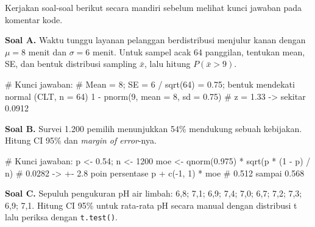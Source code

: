 \documentclass[
  indonesian,
  letterpaper,
]{book}
\newenvironment{Shaded}{\begin{snugshade}}{\end{snugshade}}
\newcommand{\AttributeTok}[1]{\textcolor[rgb]{0.40,0.45,0.13}{#1}}
\newcommand{\CommentTok}[1]{\textcolor[rgb]{0.37,0.37,0.37}{#1}}
\newcommand{\DecValTok}[1]{\textcolor[rgb]{0.68,0.00,0.00}{#1}}
\newcommand{\FloatTok}[1]{\textcolor[rgb]{0.68,0.00,0.00}{#1}}
\newcommand{\FunctionTok}[1]{\textcolor[rgb]{0.28,0.35,0.67}{#1}}
\newcommand{\NormalTok}[1]{\textcolor[rgb]{0.00,0.23,0.31}{#1}}
\newcommand{\OtherTok}[1]{\textcolor[rgb]{0.00,0.23,0.31}{#1}}
\newcommand{\SpecialCharTok}[1]{\textcolor[rgb]{0.37,0.37,0.37}{#1}}
\begin{document}
Kerjakan soal-soal berikut secara mandiri sebelum melihat kunci jawaban
pada komentar kode.

\textbf{Soal A.} Waktu tunggu layanan pelanggan berdistribusi menjulur
kanan dengan \(\mu = 8\) menit dan \(\sigma = 6\) menit. Untuk sampel
acak 64 panggilan, tentukan mean, SE, dan bentuk distribusi sampling
\(\bar{x}\), lalu hitung \(P(\bar{x} > 9)\).

\begin{Shaded}
\begin{Highlighting}[]
\CommentTok{\# Kunci jawaban:}
\CommentTok{\# Mean = 8; SE = 6 / sqrt(64) = 0.75; bentuk mendekati normal (CLT, n = 64)}
\DecValTok{1} \SpecialCharTok{{-}} \FunctionTok{pnorm}\NormalTok{(}\DecValTok{9}\NormalTok{, }\AttributeTok{mean =} \DecValTok{8}\NormalTok{, }\AttributeTok{sd =} \FloatTok{0.75}\NormalTok{)   }\CommentTok{\# z = 1.33 {-}\textgreater{} sekitar 0.0912}
\end{Highlighting}
\end{Shaded}

\textbf{Soal B.} Survei 1.200 pemilih menunjukkan 54\% mendukung sebuah
kebijakan. Hitung CI 95\% dan \emph{margin of error}-nya.

\begin{Shaded}
\begin{Highlighting}[]
\CommentTok{\# Kunci jawaban:}
\NormalTok{p }\OtherTok{\textless{}{-}} \FloatTok{0.54}\NormalTok{; n }\OtherTok{\textless{}{-}} \DecValTok{1200}
\NormalTok{moe }\OtherTok{\textless{}{-}} \FunctionTok{qnorm}\NormalTok{(}\FloatTok{0.975}\NormalTok{) }\SpecialCharTok{*} \FunctionTok{sqrt}\NormalTok{(p }\SpecialCharTok{*}\NormalTok{ (}\DecValTok{1} \SpecialCharTok{{-}}\NormalTok{ p) }\SpecialCharTok{/}\NormalTok{ n)   }\CommentTok{\# 0.0282 {-}\textgreater{} +{-} 2.8 poin persentase}
\NormalTok{p }\SpecialCharTok{+} \FunctionTok{c}\NormalTok{(}\SpecialCharTok{{-}}\DecValTok{1}\NormalTok{, }\DecValTok{1}\NormalTok{) }\SpecialCharTok{*}\NormalTok{ moe                             }\CommentTok{\# 0.512 sampai 0.568}
\end{Highlighting}
\end{Shaded}

\textbf{Soal C.} Sepuluh pengukuran pH air limbah: 6,8; 7,1; 6,9; 7,4;
7,0; 6,7; 7,2; 7,3; 6,9; 7,1. Hitung CI 95\% untuk rata-rata pH secara
manual dengan distribusi t lalu periksa dengan \texttt{t.test()}.
\end{document}
